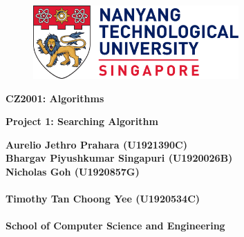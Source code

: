 

\begin{titlepage}
   \begin{center}
   \begin{doublespacing}

       \begin{figure}
       \centering
       \includegraphics[width=0.7\textwidth]{images/Nanyang_Technological_University.png}
       \end{figure}
       
       
       \vspace*{5mm}
       {\large\textbf{CZ2001: Algorithms}}

       \vspace{30mm}
       
       {\Large\textbf{Project 1: Searching Algorithm}}

    
            
       \vspace{30mm}

       {\Large\textbf{Aurelio Jethro Prahara (U1921390C) \\
       Bhargav Piyushkumar Singapuri (U1920026B) \\
       Nicholas Goh (U1920857G) \\ \\
       Timothy Tan Choong Yee (U1920534C)} \\
       }\\

       \vfill
       {\large \textbf{School of Computer Science and Engineering}}\\
       
    \end{doublespacing}

   \end{center}
\end{titlepage}
